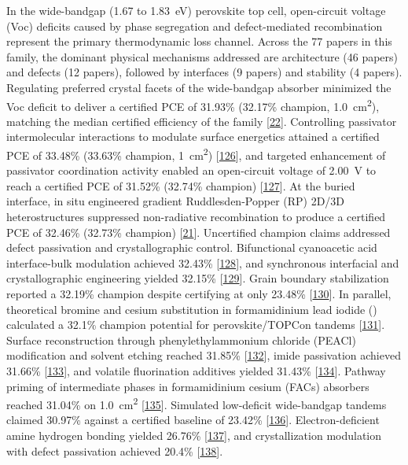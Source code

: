 \documentclass[
  11pt,
]{article}
\begin{document}
In the wide-bandgap (1.67 to \qty{1.83}{\electronvolt}) perovskite top
cell, open-circuit voltage (Voc) deficits caused by phase segregation
and defect-mediated recombination represent the primary thermodynamic
loss channel. Across the 77 papers in this family, the dominant physical
mechanisms addressed are architecture (46 papers) and defects (12
papers), followed by interfaces (9 papers) and stability (4 papers).
Regulating preferred crystal facets of the wide-bandgap absorber
minimized the Voc deficit to deliver a certified PCE of 31.93\% (32.17\%
champion, \qty{1.0}{\centi\meter\squared}), matching the median
certified efficiency of the family
{[}\href{https://doi.org/10.1016/j.esci.2026.100563}{22}{]}. Controlling
passivator intermolecular interactions to modulate surface energetics
attained a certified PCE of 33.48\% (33.63\% champion,
\qty{1}{\centi\meter\squared})
{[}\href{https://doi.org/10.1126/sciadv.aec4431}{126}{]}, and targeted
enhancement of passivator coordination activity enabled an open-circuit
voltage of \qty{2.00}{\volt} to reach a certified PCE of 31.52\%
(32.74\% champion) {[}\href{https://doi.org/10.1002/aenm.71077}{127}{]}.
At the buried interface, in situ engineered gradient Ruddlesden-Popper
(RP) 2D/3D heterostructures suppressed non-radiative recombination to
produce a certified PCE of 32.46\% (32.73\% champion)
{[}\href{https://doi.org/10.1021/acsenergylett.5c04127}{21}{]}.
Uncertified champion claims addressed defect passivation and
crystallographic control. Bifunctional cyanoacetic acid interface-bulk
modulation achieved 32.43\%
{[}\href{https://doi.org/10.1002/adma.72738}{128}{]}, and synchronous
interfacial and crystallographic engineering yielded 32.15\%
{[}\href{https://doi.org/10.1021/acsenergylett.6c00166}{129}{]}. Grain
boundary stabilization reported a 32.19\% champion despite certifying at
only 23.48\% {[}\href{https://doi.org/10.1002/adma.202521129}{130}{]}.
In parallel, theoretical bromine and cesium substitution in
formamidinium lead iodide () calculated a 32.1\% champion
potential for perovskite/TOPCon tandems
{[}\href{https://doi.org/10.26434/chemrxiv.15001694/v1}{131}{]}. Surface
reconstruction through phenylethylammonium chloride (PEACl) modification
and solvent etching reached 31.85\%
{[}\href{https://doi.org/10.1002/aenm.202506619}{132}{]}, imide
passivation achieved 31.66\%
{[}\href{https://doi.org/10.1002/aenm.70902}{133}{]}, and volatile
fluorination additives yielded 31.43\%
{[}\href{https://doi.org/10.1002/adfm.202526009}{134}{]}. Pathway
priming of intermediate phases in formamidinium cesium (FACs) absorbers
reached 31.04\% on \qty{1.0}{\centi\meter\squared}
{[}\href{https://doi.org/10.1038/s41467-026-72094-4}{135}{]}. Simulated
low-deficit wide-bandgap tandems claimed 30.97\% against a certified
baseline of 23.42\%
{[}\href{https://doi.org/10.1007/s40820-025-01959-y}{136}{]}.
Electron-deficient amine hydrogen bonding yielded 26.76\%
{[}\href{https://doi.org/10.1002/anie.9708831}{137}{]}, and
crystallization modulation with defect passivation achieved 20.4\%
{[}\href{https://doi.org/10.1038/s41467-025-68125-1}{138}{]}.
\end{document}
